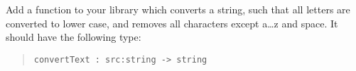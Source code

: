 \label{lowercase}
Add a function to your library which converts a string, such that all letters
are converted to lower case, and removes all characters except
a\ldots z and space. It should have the following type:
\begin{quote}
  \mbox{\lstinline!convertText : src:string -> string!}
\end{quote}
